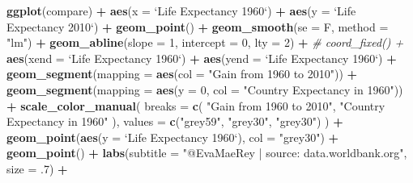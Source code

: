 \documentclass[]{book}
\newenvironment{Shaded}{\begin{snugshade}}{\end{snugshade}}
\newcommand{\KeywordTok}[1]{\textcolor[rgb]{0.13,0.29,0.53}{\textbf{#1}}}
\newcommand{\DataTypeTok}[1]{\textcolor[rgb]{0.13,0.29,0.53}{#1}}
\newcommand{\DecValTok}[1]{\textcolor[rgb]{0.00,0.00,0.81}{#1}}
\newcommand{\StringTok}[1]{\textcolor[rgb]{0.31,0.60,0.02}{#1}}
\newcommand{\CommentTok}[1]{\textcolor[rgb]{0.56,0.35,0.01}{\textit{#1}}}
\newcommand{\OperatorTok}[1]{\textcolor[rgb]{0.81,0.36,0.00}{\textbf{#1}}}
\newcommand{\NormalTok}[1]{#1}
\theoremstyle{definition}
\theoremstyle{definition}
\theoremstyle{definition}
\theoremstyle{remark}
\begin{document}
\begin{Shaded}
\begin{Highlighting}[]
\KeywordTok{ggplot}\NormalTok{(compare) }\OperatorTok{+}
\StringTok{  }\KeywordTok{aes}\NormalTok{(}\DataTypeTok{x =} \StringTok{`}\DataTypeTok{Life Expectancy 1960}\StringTok{`}\NormalTok{) }\OperatorTok{+}\StringTok{ }
\StringTok{  }\KeywordTok{aes}\NormalTok{(}\DataTypeTok{y =} \StringTok{`}\DataTypeTok{Life Expectancy 2010}\StringTok{`}\NormalTok{) }\OperatorTok{+}
\StringTok{  }\KeywordTok{geom_point}\NormalTok{() }\OperatorTok{+}
\StringTok{  }\KeywordTok{geom_smooth}\NormalTok{(}\DataTypeTok{se =}\NormalTok{ F, }\DataTypeTok{method =} \StringTok{"lm"}\NormalTok{) }\OperatorTok{+}
\StringTok{  }\KeywordTok{geom_abline}\NormalTok{(}\DataTypeTok{slope =} \DecValTok{1}\NormalTok{, }\DataTypeTok{intercept =} \DecValTok{0}\NormalTok{, }\DataTypeTok{lty =} \DecValTok{2}\NormalTok{) }\OperatorTok{+}
\StringTok{  }\CommentTok{# coord_fixed() +}
\StringTok{  }\KeywordTok{aes}\NormalTok{(}\DataTypeTok{xend =} \StringTok{`}\DataTypeTok{Life Expectancy 1960}\StringTok{`}\NormalTok{) }\OperatorTok{+}
\StringTok{  }\KeywordTok{aes}\NormalTok{(}\DataTypeTok{yend =} \StringTok{`}\DataTypeTok{Life Expectancy 1960}\StringTok{`}\NormalTok{) }\OperatorTok{+}
\StringTok{  }\KeywordTok{geom_segment}\NormalTok{(}\DataTypeTok{mapping =} \KeywordTok{aes}\NormalTok{(}\DataTypeTok{col =} \StringTok{"Gain from 1960 to 2010"}\NormalTok{)) }\OperatorTok{+}
\StringTok{  }\KeywordTok{geom_segment}\NormalTok{(}\DataTypeTok{mapping =} \KeywordTok{aes}\NormalTok{(}\DataTypeTok{y =} \DecValTok{0}\NormalTok{, }\DataTypeTok{col =} \StringTok{"Country Expectancy in 1960"}\NormalTok{)) }\OperatorTok{+}
\StringTok{  }\KeywordTok{scale_color_manual}\NormalTok{(}
    \DataTypeTok{breaks =} \KeywordTok{c}\NormalTok{(}
      \StringTok{"Gain from 1960 to 2010"}\NormalTok{,}
      \StringTok{"Country Expectancy in 1960"}
\NormalTok{    ),}
    \DataTypeTok{values =} \KeywordTok{c}\NormalTok{(}\StringTok{"grey59"}\NormalTok{, }\StringTok{"grey30"}\NormalTok{, }\StringTok{"grey30"}\NormalTok{)}
\NormalTok{  ) }\OperatorTok{+}
\StringTok{  }\KeywordTok{geom_point}\NormalTok{(}\KeywordTok{aes}\NormalTok{(}\DataTypeTok{y =} \StringTok{`}\DataTypeTok{Life Expectancy 1960}\StringTok{`}\NormalTok{), }\DataTypeTok{col =} \StringTok{"grey30"}\NormalTok{) }\OperatorTok{+}
\StringTok{  }\KeywordTok{geom_point}\NormalTok{() }\OperatorTok{+}
\StringTok{  }\KeywordTok{labs}\NormalTok{(}\DataTypeTok{subtitle =} \StringTok{"@EvaMaeRey | source: data.worldbank.org"}\NormalTok{, }\DataTypeTok{size =}\NormalTok{ .}\DecValTok{7}\NormalTok{) }\OperatorTok{+}

\end{Highlighting}
\end{Shaded}
\end{document}
